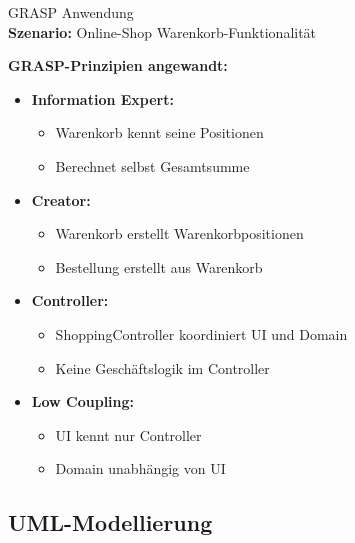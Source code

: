 \begin{example2}{GRASP Anwendung}\\
\textbf{Szenario:} Online-Shop Warenkorb-Funktionalität

\textbf{GRASP-Prinzipien angewandt:}
\begin{itemize}
    \item \textbf{Information Expert:}
    \begin{itemize}
        \item Warenkorb kennt seine Positionen
        \item Berechnet selbst Gesamtsumme
    \end{itemize}
    
    \item \textbf{Creator:}
    \begin{itemize}
        \item Warenkorb erstellt Warenkorbpositionen
        \item Bestellung erstellt aus Warenkorb
    \end{itemize}
    
    \item \textbf{Controller:}
    \begin{itemize}
        \item ShoppingController koordiniert UI und Domain
        \item Keine Geschäftslogik im Controller
    \end{itemize}
    
    \item \textbf{Low Coupling:}
    \begin{itemize}
        \item UI kennt nur Controller
        \item Domain unabhängig von UI
    \end{itemize}
\end{itemize}
\end{example2}

\subsection{UML-Modellierung}

